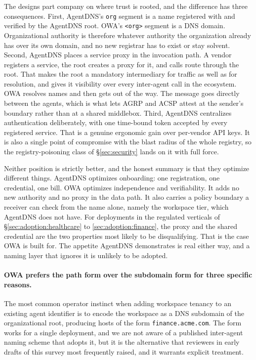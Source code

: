 The designs part company on where trust is rooted, and the
difference has three consequences. First, AgentDNS's
\texttt{org} segment is a name registered with and verified
by the AgentDNS root. OWA's \texttt{<org>} segment is a DNS
domain. Organizational authority is therefore whatever
authority the organization already has over its own domain,
and no new registrar has to exist or stay solvent. Second,
AgentDNS places a service proxy in the invocation path. A
vendor registers a service, the root creates a proxy for it,
and calls route through the root. That makes the root a
mandatory intermediary for traffic as well as for
resolution, and gives it visibility over every inter-agent
call in the ecosystem. OWA resolves names and then gets out
of the way. The message goes directly between the agents,
which is what lets AGRP and ACSP attest at the sender's
boundary rather than at a shared middlebox. Third, AgentDNS
centralizes authentication deliberately, with one
time-bound token accepted by every registered service. That
is a genuine ergonomic gain over per-vendor API keys. It is
also a single point of compromise with the blast radius
of the whole registry, so the registry-poisoning class of
\S\ref{sec:security} lands on it with full force.

Neither position is strictly better, and the honest summary
is that they optimize different things. AgentDNS optimizes
onboarding: one registration, one credential, one bill.
OWA optimizes independence and verifiability. It adds no new
authority and no proxy in the data path. It also carries a
policy boundary a receiver can check from the name alone,
namely the workspace tier, which AgentDNS does not
have. For deployments in
the regulated verticals of \S\ref{sec:adoption:healthcare}
to \ref{sec:adoption:finance}, the proxy and the shared
credential are the two properties most likely to be
disqualifying. That is the case OWA is built for. The
appetite AgentDNS demonstrates is real either way, and a
naming layer that ignores it is unlikely to be adopted.

\paragraph{OWA prefers the path form over the subdomain
form for three specific reasons.}
The most common operator instinct when adding workspace
tenancy to an existing agent identifier is to encode the
workspace as a DNS subdomain of the organizational root,
producing hosts of the form \texttt{finance.acme.com}. The
form works for a single deployment, and we are not aware
of a published inter-agent naming scheme that adopts it,
but it is the alternative that reviewers in early drafts
of this survey most frequently raised, and it warrants
explicit treatment.

